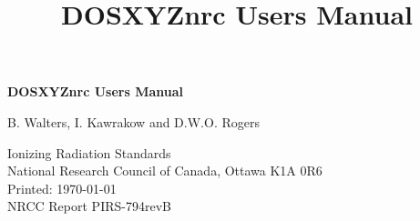 \documentclass[12pt,twoside]{article}      %
\begin{document}
\title{DOSXYZnrc Users Manual}
\begin{center}
{\sffamily \bfseries \Huge DOSXYZnrc Users Manual \vspace{5mm}\\}
\begin{large}
B. Walters, I. Kawrakow and D.W.O. Rogers \\
\end{large}
{Ionizing Radiation Standards}\\
{National Research Council of Canada,}
Ottawa K1A 0R6\\

Printed: \today  \vspace{7mm}\\
\hfill NRCC Report {\sf PIRS-794revB       }\\


\end{center}
\end{document}
